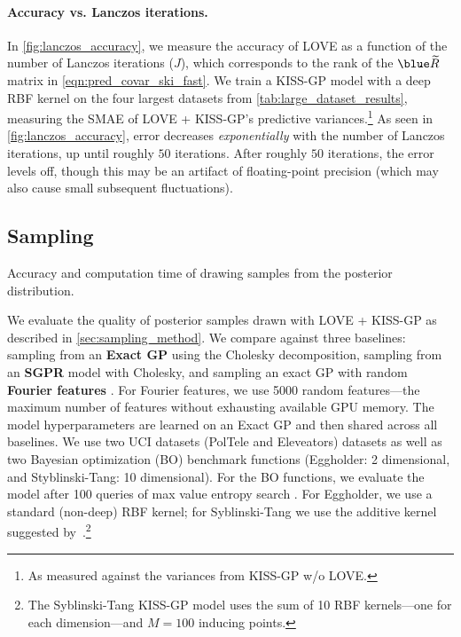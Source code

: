\paragraph{Accuracy vs. Lanczos iterations.}
In \cref{fig:lanczos_accuracy}, we measure the accuracy of LOVE{} as a function of the number of Lanczos iterations ($J$), which corresponds to the rank of the $\blue \widetilde \bR$ matrix in \cref{eqn:pred_covar_ski_fast}.
We train a KISS-GP model with a deep RBF kernel on the four largest datasets from \cref{tab:large_dataset_results}, measuring the SMAE of LOVE + KISS-GP's predictive variances.\footnote{
  As measured against the variances from KISS-GP w/o LOVE.
}
As seen in \cref{fig:lanczos_accuracy}, error decreases \emph{exponentially} with the number of Lanczos iterations, up until roughly $50$ iterations.
After roughly $50$ iterations, the error levels off, though this may be an artifact of floating-point precision (which may also cause small subsequent fluctuations).



\subsection{Sampling}

\begin{table}[t!]
  \caption[Accuracy and computation time of drawing samples from the posterior distribution.]{
    Accuracy and computation time of drawing samples from the posterior distribution.
    \label{tab:sampling_results}
  }
  \vspace{0.5ex}
  \centering
  \resizebox{\textwidth}{!}{%
    
  }
  \vspace{1em}

  \resizebox{\textwidth}{!}{%
    
  }
\end{table}

We evaluate the quality of posterior samples drawn with LOVE + KISS-GP{} as described in \cref{sec:sampling_method}.
We compare against three baselines: sampling from an {\bf Exact GP} using the Cholesky decomposition, sampling from an {\bf SGPR} model with Cholesky, and sampling an exact GP with random {\bf Fourier features} \citep{rahimi2008random}.
For Fourier features, we use 5000 random features---the maximum number of features without exhausting available GPU memory.
The model hyperparameters are learned on an Exact GP and then shared across all baselines.
We use two UCI datasets (PolTele and Eleveators) datasets as well as two Bayesian optimization (BO) benchmark functions (Eggholder: 2 dimensional, and Styblinski-Tang: 10 dimensional).
For the BO functions, we evaluate the model after 100 queries of max value entropy search \cite{wang2017max}.
For Eggholder, we use a standard (non-deep) RBF kernel;  for Syblinski-Tang we use the additive kernel suggested by~\citet{kandasamy2015high}.\footnote{
  The Syblinski-Tang KISS-GP model uses the sum of 10 RBF kernels---one for each dimension---and $M=100$ inducing points.
}

